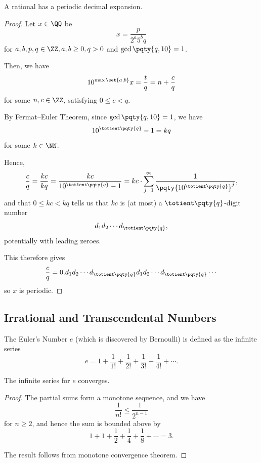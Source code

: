 \begin{proposition}
    A rational has a periodic decimal expansion.
\end{proposition}

\begin{proof}
    Let \(x \in \QQ\) be
    \[
        x = \frac{p}{2^a 5^b q}
    \]
    for \(a, b, p, q \in \ZZ, a, b \geq 0, q > 0\) and \(\gcd\pqty{q, 10} = 1\).

    Then, we have
    \[
        10^{\max\set{a, b}} x = \frac{t}{q} = n + \frac{c}{q}
    \]
    for some \(n, c \in \ZZ\), satisfying \(0 \leq c < q\).

    By Fermat--Euler Theorem, since \(\gcd\pqty{q, 10} = 1\), we have
    \[
        10^{\totient\pqty{q}} - 1 = kq
    \]
    for some \(k \in \NN\).

    Hence,
    \[
        \frac{c}{q} = \frac{kc}{kq} = \frac{kc}{10^{\totient\pqty{q}} - 1} = kc \cdot \sum_{j = 1}^{\infty} \frac{1}{\pqty{10^{\totient\pqty{q}}}^j},
    \]
    and that \(0 \leq kc < kq\) tells us that \(kc\) is (at most) a \(\totient\pqty{q}\)-digit number
    \[
        d_1 d_2 \cdots d_{\totient\pqty{q}},
    \]
    potentially with leading zeroes.

    This therefore gives
    \[
        \frac{c}{q} = 0.d_1 d_2 \cdots d_{\totient\pqty{q}} d_1 d_2 \cdots d_{\totient\pqty{q}} \cdots
    \]
    so \(x\) is periodic.
\end{proof}

\subsection{Irrational and Transcendental Numbers}

\begin{definition}
    The Euler's Number \(e\) (which is discovered by Bernoulli) is defined as the infinite series
    \[
        e = 1 + \frac{1}{1!} + \frac{1}{2!} + \frac{1}{3!} + \frac{1}{4!} + \cdots.
    \]
\end{definition}

\begin{proposition}[\(e\) exists]
    The infinite series for \(e\) converges.
\end{proposition}

\begin{proof}
    The partial sums form a monotone sequence, and we have
    \[
        \frac{1}{n!} \leq \frac{1}{2^{n - 1}}
    \]
    for \(n \geq 2\), and hence the sum is bounded above by
    \[
        1 + 1 + \frac{1}{2} + \frac{1}{4} + \frac{1}{8} + \cdots = 3.
    \]

    The result follows from monotone convergence theorem.
\end{proof}

